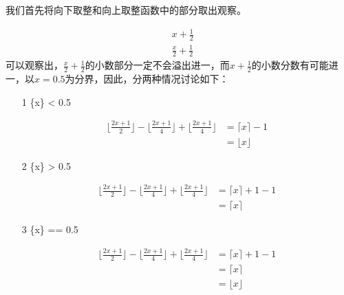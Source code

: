 \documentclass[]{article}
\begin{document}
我们首先将向下取整和向上取整函数中的部分取出观察。\par 
\begin{align}
    &x+\frac{1}{2} \\
    &\frac{x}{2}+\frac{1}{2} 
\end{align}
可以观察出，$\frac{x}{2}+\frac{1}{2}$的小数部分一定不会溢出进一，而$x+\frac{1}{2}$的小数分数有可能进一，以${x} = 0.5$为分界，因此，分两种情况讨论如下：
\begin{enumerate}
    \item[1] \{x\} < 0.5 \par 
    \begin{align}
        \lfloor \frac{2x+1}{2} \rfloor - \lfloor \frac{2x+1}{4} \rfloor + \lfloor \frac{2x+1}{4} \rfloor &= \lceil x \rceil - 1\\
        &= \lfloor x \rfloor
    \end{align}
    \item[2] \{x\} > 0.5 \par 
    \begin{align}
        \lfloor \frac{2x+1}{2} \rfloor - \lfloor \frac{2x+1}{4} \rfloor + \lfloor \frac{2x+1}{4} \rfloor &= \lceil x \rceil + 1 - 1\\
        &= \lceil x \rceil      
    \end{align}
    \item[3] \{x\} == 0.5 \par 
    \begin{align}
        \lfloor \frac{2x+1}{2} \rfloor - \lfloor \frac{2x+1}{4} \rfloor + \lfloor \frac{2x+1}{4} \rfloor &= \lceil x \rceil + 1 - 1\\
        &= \lceil x \rceil \\
        &= \lfloor x \rfloor     
    \end{align}

\end{enumerate}
\end{document}
